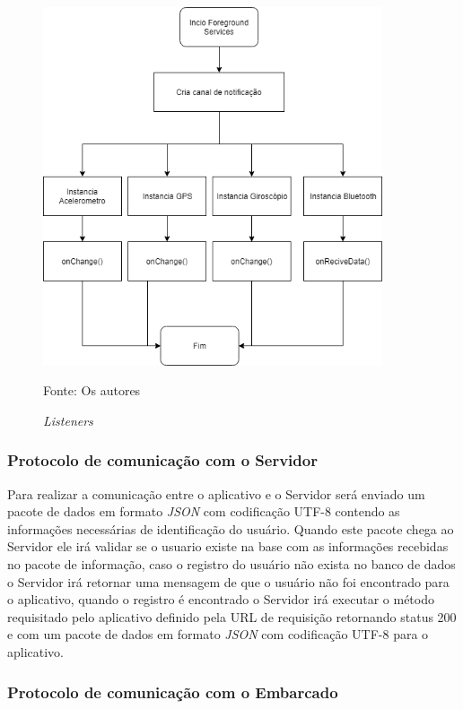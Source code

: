  \begin{figure}[H]

\begin{center}
     \caption{\textit{Listeners}}
  \includegraphics[width=100mm]{images/Cap4/notificao_android.png}
\end{center}
 \scriptsize Fonte: Os autores   
  
\end{figure}



\subsubsection{Protocolo de comunicação com o Servidor}

Para realizar a comunicação entre o aplicativo e o Servidor será enviado um pacote de dados em formato \textit{JSON} com codificação UTF-8  contendo as informações necessárias de identificação do usuário. Quando este pacote chega ao Servidor ele irá validar se o  usuario existe na base com as informações recebidas no pacote de informação, caso o registro do usuário não exista no banco de dados o Servidor irá retornar uma mensagem de que o usuário não foi encontrado para o aplicativo, quando o registro é encontrado  o Servidor irá executar o método requisitado pelo aplicativo definido pela URL de requisição retornando status 200 e com um pacote de dados em formato \textit{JSON} com codificação UTF-8 para o aplicativo.


\subsubsection{Protocolo de comunicação com o Embarcado}

